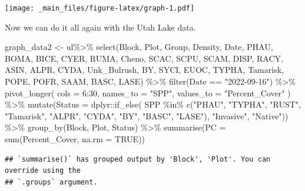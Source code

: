 \documentclass[
]{book}
\newenvironment{Shaded}{\begin{snugshade}}{\end{snugshade}}
\newcommand{\AttributeTok}[1]{\textcolor[rgb]{0.77,0.63,0.00}{#1}}
\newcommand{\ConstantTok}[1]{\textcolor[rgb]{0.00,0.00,0.00}{#1}}
\newcommand{\DecValTok}[1]{\textcolor[rgb]{0.00,0.00,0.81}{#1}}
\newcommand{\FunctionTok}[1]{\textcolor[rgb]{0.00,0.00,0.00}{#1}}
\newcommand{\NormalTok}[1]{#1}
\newcommand{\OtherTok}[1]{\textcolor[rgb]{0.56,0.35,0.01}{#1}}
\newcommand{\SpecialCharTok}[1]{\textcolor[rgb]{0.00,0.00,0.00}{#1}}
\newcommand{\StringTok}[1]{\textcolor[rgb]{0.31,0.60,0.02}{#1}}
\begin{document}
\texttt{[image: \_main\_files/figure-latex/graph-1.pdf]}

Now we can do it all again with the Utah Lake data.

\begin{Shaded}
\begin{Highlighting}[]
\NormalTok{graph\_data2 }\OtherTok{\textless{}{-}}\NormalTok{ ul}\SpecialCharTok{\%\textgreater{}\%}
  \FunctionTok{select}\NormalTok{(Block, Plot, Group, Density, Date, PHAU, BOMA, BICE, CYER, RUMA,}
\NormalTok{         Cheno, SCAC, SCPU, SCAM, DISP, RACY, ASIN, ALPR, CYDA, Unk\_Bulrush, BY, SYCI,}
\NormalTok{         EUOC, TYPHA, Tamarisk, POPE, POFR, SAAM, BASC, LASE) }\SpecialCharTok{\%\textgreater{}\%}
  \FunctionTok{filter}\NormalTok{(Date }\SpecialCharTok{==} \StringTok{"2022{-}09{-}16"}\NormalTok{) }\SpecialCharTok{\%\textgreater{}\%} 
  \FunctionTok{pivot\_longer}\NormalTok{(}
    \AttributeTok{cols =} \DecValTok{6}\SpecialCharTok{:}\DecValTok{30}\NormalTok{, }
    \AttributeTok{names\_to =} \StringTok{"SPP"}\NormalTok{,}
    \AttributeTok{values\_to =} \StringTok{"Percent\_Cover"}
\NormalTok{  ) }\SpecialCharTok{\%\textgreater{}\%} 
  \FunctionTok{mutate}\NormalTok{(}\AttributeTok{Status =} 
\NormalTok{                  dplyr}\SpecialCharTok{::}\FunctionTok{if\_else}\NormalTok{(}
\NormalTok{                    SPP }\SpecialCharTok{\%in\%}
                      \FunctionTok{c}\NormalTok{(}\StringTok{"PHAU"}\NormalTok{, }\StringTok{"TYPHA"}\NormalTok{, }\StringTok{"RUST"}\NormalTok{, }\StringTok{"Tamarisk"}\NormalTok{, }\StringTok{"ALPR"}\NormalTok{, }\StringTok{"CYDA"}\NormalTok{, }\StringTok{"BY"}\NormalTok{, }
                        \StringTok{"BASC"}\NormalTok{, }\StringTok{"LASE"}\NormalTok{), }
                    \StringTok{"Invasive"}\NormalTok{, }\StringTok{"Native"}\NormalTok{)) }\SpecialCharTok{\%\textgreater{}\%} 
  \FunctionTok{group\_by}\NormalTok{(Block, Plot, Status) }\SpecialCharTok{\%\textgreater{}\%}
  \FunctionTok{summarise}\NormalTok{(}\AttributeTok{PC =} \FunctionTok{sum}\NormalTok{(Percent\_Cover, }\AttributeTok{na.rm =} \ConstantTok{TRUE}\NormalTok{))}
\end{Highlighting}
\end{Shaded}

\begin{verbatim}
## `summarise()` has grouped output by 'Block', 'Plot'. You can override using the
## `.groups` argument.
\end{verbatim}
\end{document}
